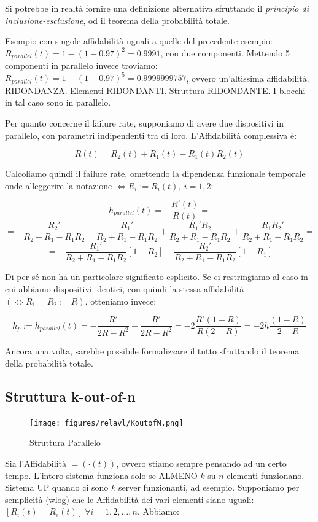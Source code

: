 Si potrebbe in realtà fornire una definizione alternativa sfruttando il \textit{principio di inclusione-esclusione}, od il teorema della probabilità totale.

Esempio con singole affidabilità uguali a quelle del precedente esempio: $R_{parallel}(t) = 1-(1-0.97)^2 = 0.9991$, con due componenti. Mettendo 5 componenti in parallelo invece troviamo: $R_{parallel}(t)=1-(1-0.97)^5=0.9999999757$, ovvero un'altissima affidabilità. RIDONDANZA. Elementi RIDONDANTI. Struttura RIDONDANTE. I blocchi in tal caso sono in parallelo.

Per quanto concerne il failure rate, supponiamo di avere due dispositivi in parallelo, con parametri indipendenti tra di loro. L'Affidabilità complessiva è:

\[	
	R(t) = R_2(t)+R_1(t)-R_1(t)R_2(t)
\]

Calcoliamo quindi il failure rate, omettendo la dipendenza funzionale temporale onde alleggerire la notazione $\iff R_i:=R_i(t),\ i=1,2$:

\[
	h_{parallel}(t) = -\frac{R'(t)}{R(t)} =
\]
\[
	= -\frac{R_2'}{R_2+R_1-R_1R_2} -\frac{R_1'}{R_2+R_1-R_1R_2} +\frac{R_1'R_2}{R_2+R_1-R_1R_2} +\frac{R_1R_2'}{R_2+R_1-R_1R_2} =
\]
\[
	= -\frac{R_1'}{R_2+R_1-R_1R_2}[1-R_2] -\frac{R_2'}{R_2+R_1-R_1R_2}[1-R_1]
\]

Di per sé non ha un particolare significato esplicito. Se ci restringiamo al caso in cui abbiamo dispositivi identici, con quindi la stessa affidabilità $(\iff R_1=R_2:=R)$, otteniamo invece:

\[
	h_p := h_{parallel}(t) = -\frac{R'}{2R-R^2} -\frac{R'}{2R-R^2} = -2\frac{R'(1-R)}{R(2-R)} = -2h\frac{(1-R)}{2-R}
\]

Ancora una volta, sarebbe possibile formalizzare il tutto sfruttando il teorema della probabilità totale.
	

\subsection{Struttura k-out-of-n}

\begin{center}
\begin{figure}[H]
\centering
\texttt{[image: figures/relavl/KoutofN.png]}
\caption{Struttura Parallelo}
\end{figure}
\end{center}

Sia l'Affidabilità $= (\mathord{\cdot}(t))$, ovvero stiamo sempre pensando ad un certo tempo. L'intero sistema funziona solo se ALMENO $k$ su $n$ elementi funzionano. Sistema UP quando ci sono $k$ server funzionanti, ad esempio. Supponiamo per semplicità (wlog) che le Affidabilità dei vari elementi siano uguali: $[R_i(t)=R_e(t)]\ \forall i=1,2,\dots,n$. Abbiamo:

